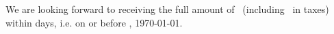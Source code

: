 \documentclass[	backaddress=off,
				paper=letter,
				fontsize=11pt,
				parskip=full]{scrlttr2}
\begin{document}
\begin{letter}
We are looking forward to receiving the full amount of
 \Total\ (including \TaxAmnt\ in taxes) within \numberstringnum{\payperiod}
 days{}, i.e. on or before \DayName{\year}{\month}{\day+\payperiod},
 \AdvanceDate[\payperiod]\today{}. 

		\AdvanceDate[-\payperiod]				%
		\enlargethispage{4\baselineskip}


\closing{}					%

	\end{letter}
\end{document}
